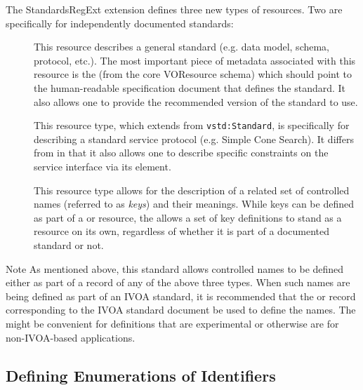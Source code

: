 \documentclass[11pt,a4paper]{ivoa}
\begin{document}
The StandardsRegExt extension defines three new types of resources.  Two
are specifically for independently documented standards:

\begin{description}
\item[] This resource describes a general standard (e.g. data model,
       schema, protocol, etc.).  The most important piece of metadata
       associated with this resource is the
       (from the core VOResource schema) 
       which should point to the human-readable specification document
       that defines the standard.  It also allows one to provide the
       recommended version of the standard to use.  
\item[] This resource type, which extends from
       \texttt{vstd:Standard}, is specifically for describing a
       standard service protocol (e.g. Simple Cone Search).  It
       differs from  in that it also allows
       one to describe specific constraints on the service interface
       via its
       element. 
\item[] This resource type allows for the description of a related set of 
       controlled names (referred to as \emph{keys}) and their
       meanings.  While keys can be defined as part of a
        or 
       resource, the  allows 
       a set of key definitions to stand as a resource on its own,
       regardless of whether it is part of a documented standard or
       not.  

\end{description}

\begin{admonition}{Note}
       As mentioned above, this standard allows controlled names to be
       defined either as part of a record of any of the above three
       types.  When such names are being defined as part of an IVOA
       standard, it is recommended that the  or
        record corresponding to the
       IVOA standard document be used to define the names.  The
        might be convenient
       for definitions that are experimental or otherwise are for
       non-IVOA-based applications.  
\end{admonition}


\subsection{Defining Enumerations of Identifiers }
\end{document}
